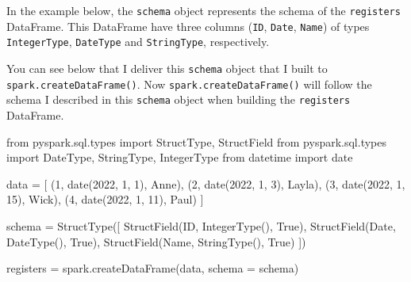 \documentclass[
  11pt,
  letterpaper,
  DIV=11,
  numbers=noendperiod]{scrreprt}
\newenvironment{Shaded}{\begin{snugshade}}{\end{snugshade}}
\newcommand{\DecValTok}[1]{\textcolor[rgb]{0.68,0.00,0.00}{#1}}
\newcommand{\ImportTok}[1]{\textcolor[rgb]{0.00,0.46,0.62}{#1}}
\newcommand{\NormalTok}[1]{\textcolor[rgb]{0.00,0.23,0.31}{#1}}
\newcommand{\OperatorTok}[1]{\textcolor[rgb]{0.37,0.37,0.37}{#1}}
\newcommand{\StringTok}[1]{\textcolor[rgb]{0.13,0.47,0.30}{#1}}
\newcommand{\VariableTok}[1]{\textcolor[rgb]{0.07,0.07,0.07}{#1}}
\begin{document}
In the example below, the \texttt{schema} object represents the schema
of the \texttt{registers} DataFrame. This DataFrame have three columns
(\texttt{ID}, \texttt{Date}, \texttt{Name}) of types
\texttt{IntegerType}, \texttt{DateType} and \texttt{StringType},
respectively.

You can see below that I deliver this \texttt{schema} object that I
built to \texttt{spark.createDataFrame()}. Now
\texttt{spark.createDataFrame()} will follow the schema I described in
this \texttt{schema} object when building the \texttt{registers}
DataFrame.

\begin{Shaded}
\begin{Highlighting}[]
\ImportTok{from}\NormalTok{ pyspark.sql.types }\ImportTok{import}\NormalTok{ StructType, StructField}
\ImportTok{from}\NormalTok{ pyspark.sql.types }\ImportTok{import}\NormalTok{ DateType, StringType, IntegerType}
\ImportTok{from}\NormalTok{ datetime }\ImportTok{import}\NormalTok{ date}

\NormalTok{data }\OperatorTok{=}\NormalTok{ [}
\NormalTok{  (}\DecValTok{1}\NormalTok{, date(}\DecValTok{2022}\NormalTok{, }\DecValTok{1}\NormalTok{, }\DecValTok{1}\NormalTok{), }\StringTok{\textquotesingle{}Anne\textquotesingle{}}\NormalTok{),}
\NormalTok{  (}\DecValTok{2}\NormalTok{, date(}\DecValTok{2022}\NormalTok{, }\DecValTok{1}\NormalTok{, }\DecValTok{3}\NormalTok{), }\StringTok{\textquotesingle{}Layla\textquotesingle{}}\NormalTok{),}
\NormalTok{  (}\DecValTok{3}\NormalTok{, date(}\DecValTok{2022}\NormalTok{, }\DecValTok{1}\NormalTok{, }\DecValTok{15}\NormalTok{), }\StringTok{\textquotesingle{}Wick\textquotesingle{}}\NormalTok{),}
\NormalTok{  (}\DecValTok{4}\NormalTok{, date(}\DecValTok{2022}\NormalTok{, }\DecValTok{1}\NormalTok{, }\DecValTok{11}\NormalTok{), }\StringTok{\textquotesingle{}Paul\textquotesingle{}}\NormalTok{)}
\NormalTok{]}

\NormalTok{schema }\OperatorTok{=}\NormalTok{ StructType([}
\NormalTok{  StructField(}\StringTok{\textquotesingle{}ID\textquotesingle{}}\NormalTok{, IntegerType(), }\VariableTok{True}\NormalTok{),}
\NormalTok{  StructField(}\StringTok{\textquotesingle{}Date\textquotesingle{}}\NormalTok{, DateType(), }\VariableTok{True}\NormalTok{),}
\NormalTok{  StructField(}\StringTok{\textquotesingle{}Name\textquotesingle{}}\NormalTok{, StringType(), }\VariableTok{True}\NormalTok{)}
\NormalTok{])}

\NormalTok{registers }\OperatorTok{=}\NormalTok{ spark.createDataFrame(data, schema }\OperatorTok{=}\NormalTok{ schema)}
\end{Highlighting}
\end{Shaded}
\end{document}
